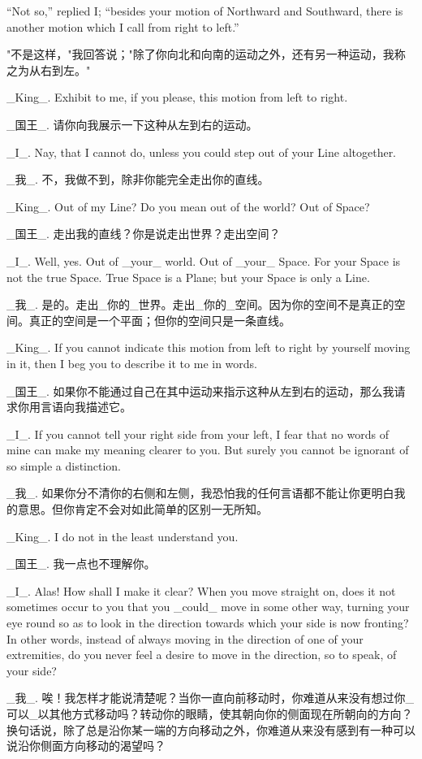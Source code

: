 \documentclass[12pt,UTF8]{ctexbook}
\begin{document}
``Not so,'' replied I; ``besides your motion of Northward and Southward, there is another motion which I call from right to left.''

"不是这样，"我回答说；"除了你向北和向南的运动之外，还有另一种运动，我称之为从右到左。"

\_King\_. Exhibit to me, if you please, this motion from left to right.

\_国王\_. 请你向我展示一下这种从左到右的运动。

\_I\_. Nay, that I cannot do, unless you could step out of your Line altogether.

\_我\_. 不，我做不到，除非你能完全走出你的直线。

\_King\_. Out of my Line? Do you mean out of the world? Out of Space?

\_国王\_. 走出我的直线？你是说走出世界？走出空间？

\_I\_. Well, yes. Out of \_your\_ world. Out of \_your\_ Space. For your Space is not the true Space. True Space is a Plane; but your Space is only a Line.

\_我\_. 是的。走出\_你的\_世界。走出\_你的\_空间。因为你的空间不是真正的空间。真正的空间是一个平面；但你的空间只是一条直线。

\_King\_. If you cannot indicate this motion from left to right by yourself moving in it, then I beg you to describe it to me in words.

\_国王\_. 如果你不能通过自己在其中运动来指示这种从左到右的运动，那么我请求你用言语向我描述它。

\_I\_. If you cannot tell your right side from your left, I fear that no words of mine can make my meaning clearer to you. But surely you cannot be ignorant of so simple a distinction.

\_我\_. 如果你分不清你的右侧和左侧，我恐怕我的任何言语都不能让你更明白我的意思。但你肯定不会对如此简单的区别一无所知。

\_King\_. I do not in the least understand you.

\_国王\_. 我一点也不理解你。

\_I\_. Alas! How shall I make it clear? When you move straight on, does it not sometimes occur to you that you \_could\_ move in some other way, turning your eye round so as to look in the direction towards which your side is now fronting? In other words, instead of always moving in the direction of one of your extremities, do you never feel a desire to move in the direction, so to speak, of your side?

\_我\_. 唉！我怎样才能说清楚呢？当你一直向前移动时，你难道从来没有想过你\_可以\_以其他方式移动吗？转动你的眼睛，使其朝向你的侧面现在所朝向的方向？换句话说，除了总是沿你某一端的方向移动之外，你难道从来没有感到有一种可以说沿你侧面方向移动的渴望吗？
\end{document}
